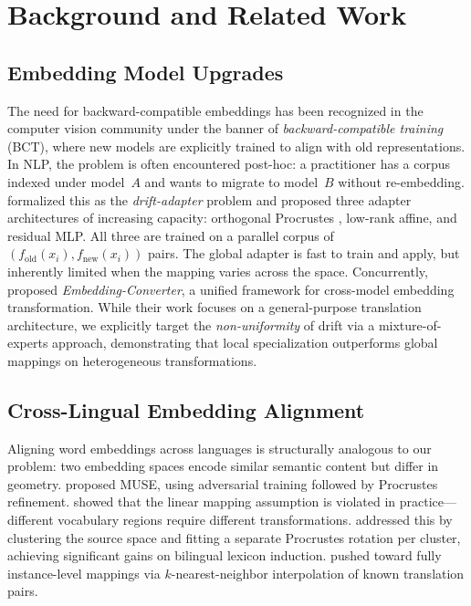\documentclass[11pt,a4paper]{article}
\newcommand{\fold}{f_{\mathrm{old}}}
\newcommand{\fnew}{f_{\mathrm{new}}}
\begin{document}
\section{Background and Related Work}
\label{sec:related}

\subsection{Embedding Model Upgrades}
\label{sec:related:upgrade}

The need for backward-compatible embeddings has been recognized in the computer vision community under the banner of \emph{backward-compatible training} (BCT), where new models are explicitly trained to align with old representations.
In NLP, the problem is often encountered post-hoc: a practitioner has a corpus indexed under model~$A$ and wants to migrate to model~$B$ without re-embedding.
\citet{vejendla2025drift} formalized this as the \emph{drift-adapter} problem and proposed three adapter architectures of increasing capacity: orthogonal Procrustes \citep{schoenemann1966procrustes}, low-rank affine, and residual MLP.
All three are trained on a parallel corpus of $(\fold(x_i), \fnew(x_i))$ pairs.
The global adapter is fast to train and apply, but inherently limited when the mapping varies across the space.
Concurrently, \citet{yoon2025embedding} proposed \emph{Embedding-Converter}, a unified framework for cross-model embedding transformation.
While their work focuses on a general-purpose translation architecture, we explicitly target the \emph{non-uniformity} of drift via a mixture-of-experts approach, demonstrating that local specialization outperforms global mappings on heterogeneous transformations.

\subsection{Cross-Lingual Embedding Alignment}
\label{sec:related:crosslingual}

Aligning word embeddings across languages is structurally analogous to our problem: two embedding spaces encode similar semantic content but differ in geometry.
\citet{conneau2018muse} proposed MUSE, using adversarial training followed by Procrustes refinement.
\citet{nakashole2018mapping} showed that the linear mapping assumption is violated in practice---different vocabulary regions require different transformations.
\citet{dan2020cluster} addressed this by clustering the source space and fitting a separate Procrustes rotation per cluster, achieving significant gains on bilingual lexicon induction.
\citet{glavas2020instamap} pushed toward fully instance-level mappings via $k$-nearest-neighbor interpolation of known translation pairs.
\end{document}
